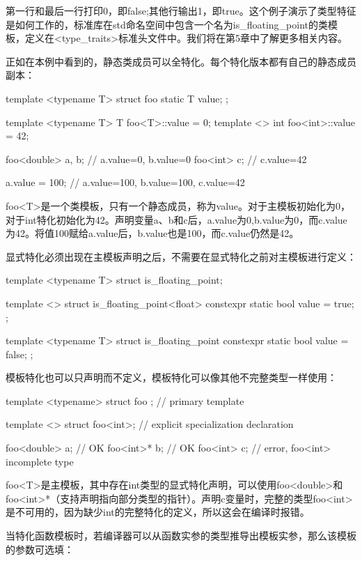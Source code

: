 第一行和最后一行打印0，即false;其他行输出1，即true。这个例子演示了类型特征是如何工作的，标准库在std命名空间中包含一个名为is_floating_point的类模板，定义在<type_traits>标准头文件中。我们将在第5章中了解更多相关内容。

正如在本例中看到的，静态类成员可以全特化。每个特化版本都有自己的静态成员副本：

\begin{cppcode}
template <typename T>
struct foo
{
	static T value;
};

template <typename T> T foo<T>::value = 0;
template <> int foo<int>::value = 42;

foo<double> a, b; // a.value=0, b.value=0
foo<int> c; // c.value=42

a.value = 100; // a.value=100, b.value=100, c.value=42
\end{cppcode}

foo<T>是一个类模板，只有一个静态成员，称为value。对于主模板初始化为0，对于int特化初始化为42。声明变量a、b和c后，a.value为0,b.value为0，而c.value为42。将值100赋给a.value后，b.value也是100，而c.value仍然是42。

显式特化必须出现在主模板声明之后，不需要在显式特化之前对主模板进行定义：

\begin{cppcode}
template <typename T>
struct is_floating_point;

template <>
struct is_floating_point<float>
{
	constexpr static bool value = true;
};

template <typename T>
struct is_floating_point
{
	constexpr static bool value = false;
};
\end{cppcode}

模板特化也可以只声明而不定义，模板特化可以像其他不完整类型一样使用：

\begin{cppcode}
template <typename>
struct foo {}; // primary template

template <>
struct foo<int>; // explicit specialization declaration

foo<double> a; // OK
foo<int>* b; // OK
foo<int> c; // error, foo<int> incomplete type
\end{cppcode}

foo<T>是主模板，其中存在int类型的显式特化声明，可以使用foo<double>和foo<int>*（支持声明指向部分类型的指针）。声明c变量时，完整的类型foo<int>是不可用的，因为缺少int的完整特化的定义，所以这会在编译时报错。

当特化函数模板时，若编译器可以从函数实参的类型推导出模板实参，那么该模板的参数可选填：

